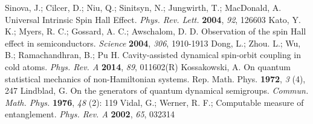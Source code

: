 \documentclass[atoms,article,submit,moreauthors,pdftex,12pt,a4paper]{mdpi}
\begin{document}
\begin{thebibliography}{999}
Sinova, J.; Cilcer, D.; Niu, Q.; Sinitsyn, N.; Jungwirth, T.; MacDonald, A. Universal Intrinsic Spin Hall Effect. {\em Phys. Rev. Lett.} {\bf 2004}, {\em 92}, 126603
Kato, Y. K.; Myers, R. C.; Gossard, A. C.; Awschalom, D. D. Observation of the spin Hall effect in semiconductors. {\em Science} {\bf 2004}, {\em 306}, 1910-1913
Dong, L.; Zhou. L.; Wu, B.; Ramachandhran, B.; Pu H. Cavity-assisted dynamical spin-orbit coupling in cold atoms. {\em Phys. Rev. A} {\bf 2014}, {\em 89}, 011602(R)
Kossakowski, A. On quantum statistical mechanics of non-Hamiltonian systems. {Rep. Math. Phys.} {\bf 1972}, {\em 3} (4), 247
Lindblad, G. On the generators of quantum dynamical semigroups. {\em Commun. Math. Phys.} {\bf 1976}, {\em 48} (2): 119
Vidal, G.; Werner, R. F.; Computable measure of entanglement. {\em Phys. Rev. A} {\bf 2002}, {\em 65}, 032314
\end{thebibliography}
\end{document}
